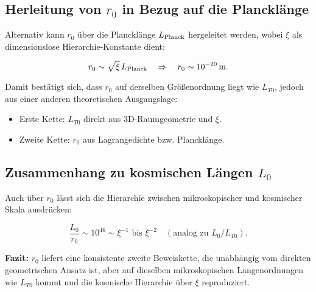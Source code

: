 \documentclass[12pt,a4paper]{article}
\begin{document}
\subsection{Herleitung von $r_0$ in Bezug auf die Plancklänge}

Alternativ kann $r_0$ über die Plancklänge $L_{\rm Planck}$ hergeleitet werden, wobei $\xi$ als dimensionslose Hierarchie-Konstante dient:

\begin{equation}
	r_0 \sim \sqrt{\xi} \, L_{\rm Planck} \quad \Rightarrow \quad r_0 \sim 10^{-20}\, \mathrm{m}.
\end{equation}

Damit bestätigt sich, dass $r_0$ auf derselben Größenordnung liegt wie $L_{T0}$, jedoch aus einer anderen theoretischen Ausgangslage:  

\begin{itemize}
	\item Erste Kette: $L_{T0}$ direkt aus 3D-Raumgeometrie und $\xi$.
	\item Zweite Kette: $r_0$ aus Lagrangedichte bzw. Plancklänge.
\end{itemize}

\subsection{Zusammenhang zu kosmischen Längen $L_0$}

Auch über $r_0$ lässt sich die Hierarchie zwischen mikroskopischer und kosmischer Skala ausdrücken:

\begin{equation}
	\frac{L_0}{r_0} \sim 10^{46} \sim \xi^{-1} \text{ bis } \xi^{-2} \quad (\text{analog zu } L_0/L_{T0}).
\end{equation}

\textbf{Fazit:} $r_0$ liefert eine konsistente zweite Beweiskette, die unabhängig vom direkten geometrischen Ansatz ist, aber auf dieselben mikroskopischen Längenordnungen wie $L_{T0}$ kommt und die kosmische Hierarchie über $\xi$ reproduziert.
	
\end{document}
